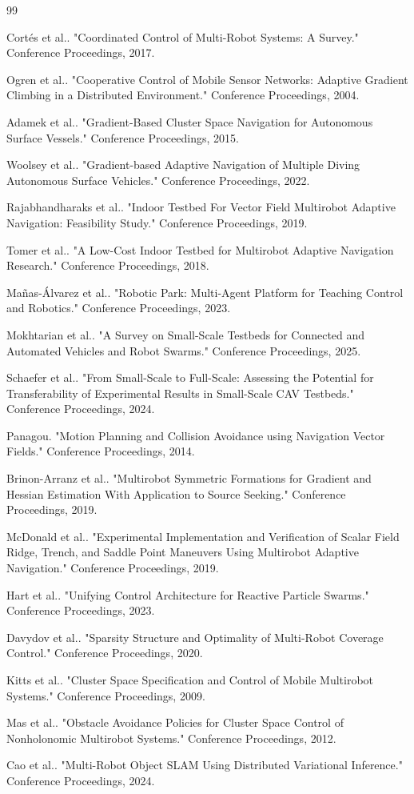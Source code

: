 \documentclass[lettersize,journal]{IEEEtran}
\begin{document}

\begin{thebibliography}{99}

 Cortés et al.. "Coordinated Control of Multi-Robot Systems: A Survey." Conference Proceedings, 2017.

 Ogren et al.. "Cooperative Control of Mobile Sensor Networks: Adaptive Gradient Climbing in a Distributed Environment." Conference Proceedings, 2004.

 Adamek et al.. "Gradient-Based Cluster Space Navigation for Autonomous Surface Vessels." Conference Proceedings, 2015.

 Woolsey et al.. "Gradient-based Adaptive Navigation of Multiple Diving Autonomous Surface Vehicles." Conference Proceedings, 2022.

 Rajabhandharaks et al.. "Indoor Testbed For Vector Field Multirobot Adaptive Navigation: Feasibility Study." Conference Proceedings, 2019.

 Tomer et al.. "A Low-Cost Indoor Testbed for Multirobot Adaptive Navigation Research." Conference Proceedings, 2018.

 Mañas-Álvarez et al.. "Robotic Park: Multi-Agent Platform for Teaching Control and Robotics." Conference Proceedings, 2023.

 Mokhtarian et al.. "A Survey on Small-Scale Testbeds for Connected and Automated Vehicles and Robot Swarms." Conference Proceedings, 2025.

 Schaefer et al.. "From Small-Scale to Full-Scale: Assessing the Potential for Transferability of Experimental Results in Small-Scale CAV Testbeds." Conference Proceedings, 2024.

 Panagou. "Motion Planning and Collision Avoidance using Navigation Vector Fields." Conference Proceedings, 2014.

 Brinon-Arranz et al.. "Multirobot Symmetric Formations for Gradient and Hessian Estimation With Application to Source Seeking." Conference Proceedings, 2019.

 McDonald et al.. "Experimental Implementation and Verification of Scalar Field Ridge, Trench, and Saddle Point Maneuvers Using Multirobot Adaptive Navigation." Conference Proceedings, 2019.

 Hart et al.. "Unifying Control Architecture for Reactive Particle Swarms." Conference Proceedings, 2023.

 Davydov et al.. "Sparsity Structure and Optimality of Multi-Robot Coverage Control." Conference Proceedings, 2020.

 Kitts et al.. "Cluster Space Specification and Control of Mobile Multirobot Systems." Conference Proceedings, 2009.

 Mas et al.. "Obstacle Avoidance Policies for Cluster Space Control of Nonholonomic Multirobot Systems." Conference Proceedings, 2012.

 Cao et al.. "Multi-Robot Object SLAM Using Distributed Variational Inference." Conference Proceedings, 2024.

\end{thebibliography}
\end{document}
